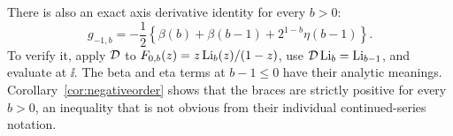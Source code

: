 There is also an exact axis derivative identity for every $b>0$:
\begin{equation}\label{eq:negativeaxis}
 g_{-1,b}=-\frac12\left\{\beta(b)+\beta(b-1)
                         +2^{1-b}\eta(b-1)\right\}.
\end{equation}
To verify it, apply $\mathcal D$ to $F_{0,b}(z)=z\operatorname{Li}_b(z)/(1-z)$, use $\mathcal D\operatorname{Li}_b=\operatorname{Li}_{b-1}$, and evaluate at $\ii$. The beta and eta terms at $b-1\le0$ have their analytic meanings. Corollary~\ref{cor:negativeorder} shows that the braces are strictly positive for every $b>0$, an inequality that is not obvious from their individual continued-series notation.
